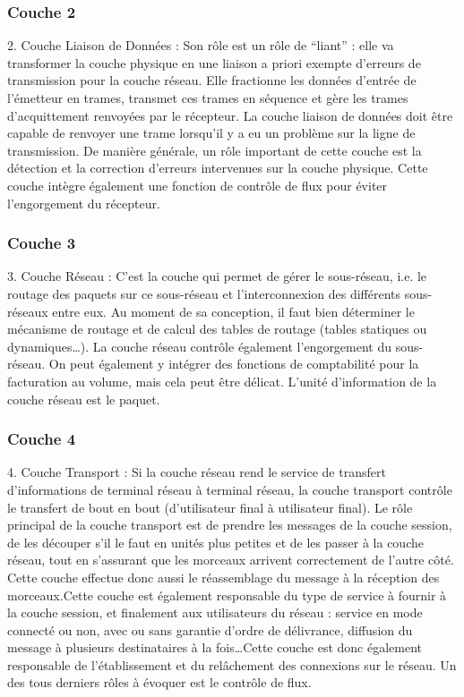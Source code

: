 \subsubsection{Couche 2}
2. Couche Liaison de Données : Son rôle est un rôle de ``liant'' : elle va transformer la couche physique en une liaison a priori exempte d'erreurs de transmission pour la couche réseau. Elle fractionne les données d'entrée de l'émetteur en trames, transmet ces trames en séquence et gère les trames d'acquittement renvoyées par le récepteur. La couche liaison de données doit être capable de renvoyer une trame lorsqu'il y a eu un problème sur la ligne de transmission. De manière générale, un rôle important de cette couche est la détection et la correction d'erreurs intervenues sur la couche physique. Cette couche intègre également une fonction de contrôle de flux pour éviter l'engorgement du récepteur.
\subsubsection{Couche 3}
3. Couche Réseau : C'est la couche qui permet de gérer le sous-réseau, i.e. le routage des paquets sur ce sous-réseau et l'interconnexion des différents sous-réseaux entre eux. Au moment de sa conception, il faut bien déterminer le mécanisme de routage et de calcul des tables de routage (tables statiques ou dynamiques\ldots). La couche réseau contrôle également l'engorgement du sous-réseau. On peut également y intégrer des fonctions de comptabilité pour la facturation au volume, mais cela peut être délicat.
L'unité d'information de la couche réseau est le paquet.
\subsubsection{Couche 4}
4. Couche Transport : Si la couche réseau rend le service de transfert d'informations de terminal réseau à terminal réseau, la couche transport contrôle le transfert de bout en bout (d'utilisateur final à utilisateur final). Le rôle principal de la couche transport est de prendre les messages de la couche session, de les découper s'il le faut en unités plus petites et de les passer à la couche réseau, tout en s'assurant que les morceaux arrivent correctement de l'autre côté. Cette couche effectue donc aussi le réassemblage du message à la réception des morceaux.Cette couche est également responsable du type de service à fournir à la couche session, et finalement aux utilisateurs du réseau : service en mode connecté ou non, avec ou sans garantie d'ordre de délivrance, diffusion du message à plusieurs destinataires à la fois\ldots Cette couche est donc également responsable de l'établissement et du relâchement des connexions sur le réseau. Un des tous derniers rôles à évoquer est le contrôle de flux.
